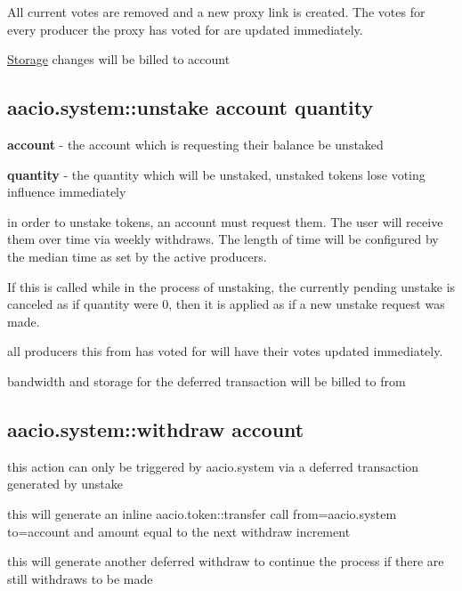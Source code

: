 All current votes are removed and a new proxy link is created. The votes for every producer the proxy has voted for are updated immediately.

\mbox{\hyperlink{struct_storage}{Storage}} changes will be billed to \textquotesingle{}account\textquotesingle{}

\subsection*{aacio.\+system\+::unstake account quantity}


\begin{DoxyItemize}
\item {\bfseries account} -\/ the account which is requesting their balance be unstaked
\item {\bfseries quantity} -\/ the quantity which will be unstaked, unstaked tokens lose voting influence immediately
\item in order to unstake tokens, an account must request them. The user will receive them over time via weekly withdraws. The length of time will be configured by the median time as set by the active producers.
\item If this is called while in the process of unstaking, the currently pending unstake is canceled as if quantity were 0, then it is applied as if a new unstake request was made.
\item all producers this \textquotesingle{}from\textquotesingle{} has voted for will have their votes updated immediately.
\item bandwidth and storage for the deferred transaction will be billed to \textquotesingle{}from\textquotesingle{}
\end{DoxyItemize}

\subsection*{aacio.\+system\+::withdraw account}


\begin{DoxyItemize}
\item this action can only be triggered by aacio.\+system via a deferred transaction generated by unstake
\item this will generate an inline aacio.\+token\+::transfer call from=aacio.\+system to=account and amount equal to the next withdraw increment
\item this will generate another deferred withdraw to continue the process if there are still withdraws to be made
\end{DoxyItemize}


